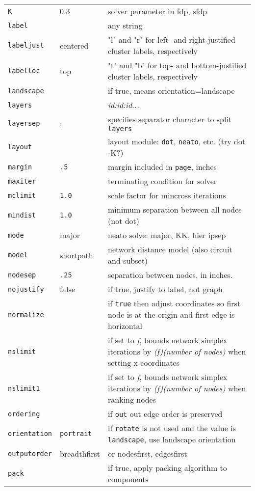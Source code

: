 \documentclass[11pt]{article}
\begin{document}
\begin{table}[p]
\begin{tabular}[t]{|l|l|p{3.5in}|}
{\tt K} & 0.3 & solver parameter in fdp, sfdp \\ 
{\tt label} & & any string \\
{\tt labeljust} & centered & "l" and "r" for left- and right-justified 
cluster labels, respectively \\
{\tt labelloc} & top & "t" and "b" for top- and bottom-justified cluster 
labels, respectively \\
{\tt landscape} & & if true, means orientation=landscape \\
{\tt layers} & & {\it id:id:id...} \\
{\tt layersep} & : & specifies separator character to split {\tt layers} \\
{\tt layout} &  & layout module: {\tt dot}, {\tt neato}, etc. (try dot -K?) \\
{\tt margin} & {\tt .5} & margin included in {\tt page}, inches \\
{\tt maxiter} & & terminating condition for solver \\
{\tt mclimit} & {\tt 1.0} & scale factor for mincross iterations \\
{\tt mindist} & {\tt 1.0} & minimum separation between all nodes (not dot)\\
{\tt mode} & major & neato solve: major, KK, hier ipsep \\
{\tt model} & shortpath & network distance model (also circuit and subset)\\
{\tt nodesep} & {\tt .25} & separation between nodes, in inches. \\
{\tt nojustify} & false & if true, justify to label, not graph \\
{\tt normalize} & & if {\tt true} then adjust coordinates so first node is at the origin and first edge is horizontal \\
{\tt nslimit} & & if set to {\it f}, bounds network simplex iterations by {\it (f)(number of nodes)} when setting x-coordinates \\ 
{\tt nslimit1} & & if set to {\it f}, bounds network simplex iterations by {\it (f)(number of nodes)} when ranking nodes \\ 
{\tt ordering} & & if {\tt out} out edge order is preserved \\
{\tt orientation} & {\tt portrait} & if {\tt rotate} is not used and the value
is {\tt landscape}, use landscape orientation \\
{\tt outputorder} & breadthfirst & or nodesfirst, edgesfirst \\
{\tt pack} & & if true, apply packing algorithm to components \\

\end{tabular}
\end{table}
\end{document}
